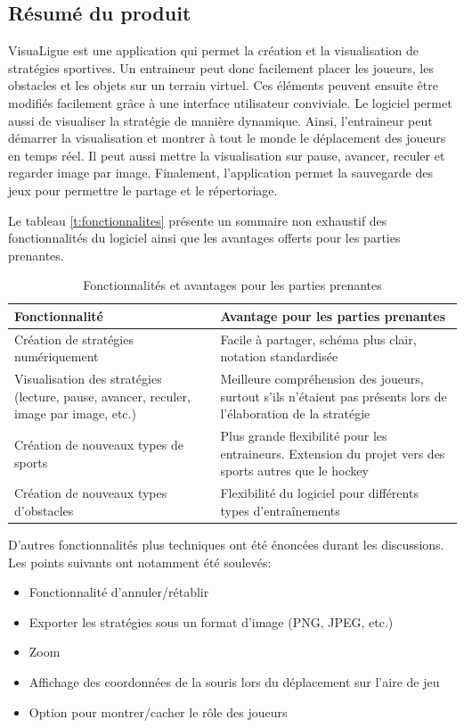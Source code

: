 \documentclass[ULlof]{ULrapport}
\begin{document}
\subsection{Résumé du produit}
VisuaLigue est une application qui permet la création et la visualisation de stratégies sportives. Un entraineur peut donc facilement placer les joueurs, les obstacles et les objets sur un terrain virtuel. Ces éléments peuvent ensuite être modifiés facilement grâce à une interface utilisateur conviviale. Le logiciel permet aussi de visualiser la stratégie de manière dynamique. Ainsi, l'entraineur peut démarrer la visualisation et montrer à tout le monde le déplacement des joueurs en temps réel. Il peut aussi mettre la visualisation sur pause, avancer, reculer et regarder image par image. Finalement, l'application permet la sauvegarde des jeux pour permettre le partage et le répertoriage.

Le tableau \ref{t:fonctionnalites} présente un sommaire non exhaustif des fonctionnalités du logiciel ainsi que les avantages offerts pour les parties prenantes.

\begin{table}[h]
	\begin{tabular}{|p{6cm}|p{8cm}|}
		\hline
		\bfseries{Fonctionnalité}              & \bfseries{Avantage pour les parties prenantes} \\\hline
		Création de stratégies numériquement   & Facile à partager, schéma plus clair, notation standardisée \\\hline
		Visualisation des stratégies (lecture, pause, avancer, reculer, image par image, etc.) & Meilleure compréhension des joueurs, surtout s'ils n'étaient pas présents lors de l'élaboration de la stratégie \\\hline
		Création de nouveaux types de sports   & Plus grande flexibilité pour les entraineurs. Extension du projet vers des sports autres que le hockey \\\hline
		Création de nouveaux types d'obstacles & Flexibilité du logiciel pour différents types d'entraînements \\
		\hline
	\end{tabular}
	\caption{Fonctionnalités et avantages pour les parties prenantes}
\end{table}

D'autres fonctionnalités plus techniques ont été énoncées durant les discussions. Les points suivants ont notamment été soulevés:
\begin{itemize}
	\item Fonctionnalité d'annuler/rétablir
	\item Exporter les stratégies sous un format d'image (PNG, JPEG, etc.)
	\item Zoom
	\item Affichage des coordonnées de la souris lors du déplacement sur l'aire de jeu
	\item Option pour montrer/cacher le rôle des joueurs
\end{itemize}
\end{document}
